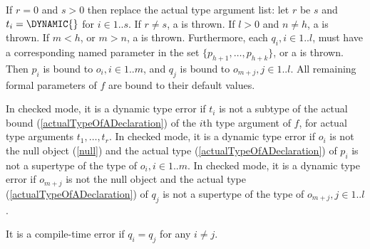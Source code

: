 \documentclass{article}
\begin{document}
%
%
%
\LMHash{}
If $r = 0$ and $s > 0$ then replace the actual type argument list:
let $r$ be $s$ and $t_i = \DYNAMIC{}$ for $i \in 1 .. s$.
If $r \not= s$, a  is thrown.
If $l > 0$ and $n \not= h$, a  is thrown.
If $m < h$, or $m > n$, a  is thrown.
Furthermore, each
$q_i, i \in 1 .. l$,
must have a corresponding named parameter in the set
$\{p_{h+1}, \ldots, p_{h+k}\}$,
or a  is thrown.
Then $p_i$ is bound to
$o_i, i \in 1 .. m$,
and $q_j$ is bound to $o_{m+j}, j \in 1 .. l$.
All remaining formal parameters of $f$ are bound to their default values.


\LMHash{}
In checked mode, it is a dynamic type error if $t_i$ is not a subtype of the actual bound (\ref{actualTypeOfADeclaration}) of the $i$th type argument of $f$, for actual type arguments $t_1, \ldots, t_r$.
In checked mode, it is a dynamic type error if $o_i$ is not the null object (\ref{null}) and the actual type (\ref{actualTypeOfADeclaration}) of $p_i$ is not a supertype of the type of $o_i, i \in 1 .. m$.
In checked mode, it is a dynamic type error if $o_{m+j}$ is not the null object and the actual type (\ref{actualTypeOfADeclaration}) of $q_j$ is not a supertype of the type of $o_{m+j}, j \in 1 .. l$.

\LMHash{}
It is a compile-time error if $q_i = q_j$ for any $i \ne j$.
\end{document}
